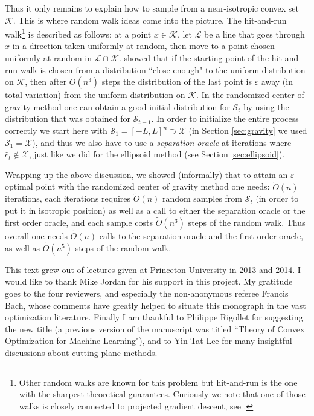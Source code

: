 \documentclass[openany]{now}
\newcommand{\cL}{\mathcal{L}}
\newcommand{\cX}{\mathcal{X}}
\newcommand{\cS}{\mathcal{S}}
\newcommand{\cK}{\mathcal{K}}
\renewcommand{\epsilon}{\varepsilon}
\renewcommand{\tilde}{\widetilde}
\begin{document}
Thus it only remains to explain how to sample from a near-isotropic convex set $\cK$. This is where random walk ideas come into the picture. The hit-and-run walk\footnote{Other random walks are known for this problem but hit-and-run is the one with the sharpest theoretical guarantees. Curiously we note that one of those walks is closely connected to projected gradient descent, see \cite{BEL15}.} is described as follows: at a point $x \in \cK$, let $\cL$ be a line that goes through $x$ in a direction taken uniformly at random, then move to a point chosen uniformly at random in $\cL \cap \cK$. \cite{Lov98} showed that if the starting point of the hit-and-run walk is chosen from a distribution ``close enough" to the uniform distribution on $\cK$, then after $O(n^3)$ steps the distribution of the last point is $\epsilon$ away (in total variation) from the uniform distribution on $\cK$. In the randomized center of gravity method one can obtain a good initial distribution for $\cS_t$ by using the distribution that was obtained for $\cS_{t-1}$. In order to initialize the entire process correctly we start here with $\cS_1 = [-L, L]^n \supset \cX$ (in Section \ref{sec:gravity} we used $\cS_1 = \cX$), and thus we also have to use a {\em separation oracle} at iterations where $\hat{c}_t \not\in \cX$, just like we did for the ellipsoid method (see Section \ref{sec:ellipsoid}).

Wrapping up the above discussion, we showed (informally) that to attain an $\epsilon$-optimal point with the randomized center of gravity method one needs: $\tilde{O}(n)$ iterations, each iterations requires $\tilde{O}(n)$ random samples from $\cS_t$ (in order to put it in isotropic position) as well as a call to either the separation oracle or the first order oracle, and each sample costs $\tilde{O}(n^3)$ steps of the random walk. Thus overall one needs $\tilde{O}(n)$ calls to the separation oracle and the first order oracle, as well as $\tilde{O}(n^5)$ steps of the random walk. 
\begin{acknowledgements}
This text grew out of lectures given at Princeton University in 2013 and 2014. I would like to thank Mike Jordan for his support in this project.
My gratitude goes to the four reviewers, and especially the non-anonymous referee Francis Bach, whose comments have greatly helped
to situate this monograph in the vast optimization literature. Finally I am thankful to Philippe Rigollet for suggesting the new title (a previous version of the manuscript was titled ``Theory of Convex Optimization for Machine Learning"), and to Yin-Tat Lee for many insightful discussions about cutting-plane methods.
\end{acknowledgements}



\end{document}
